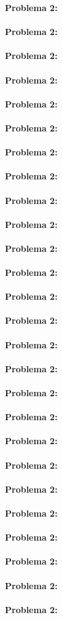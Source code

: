 \documentclass[10pt]{article}
\begin{document}
\textbf{Problema 2:} \\ \\
\textbf{Problema 2:} \\ \\
\textbf{Problema 2:} \\ \\
\textbf{Problema 2:} \\ \\
\textbf{Problema 2:} \\ \\
\textbf{Problema 2:} \\ \\
\textbf{Problema 2:} \\ \\
\textbf{Problema 2:} \\ \\

\textbf{Problema 2:} \\ \\
\textbf{Problema 2:} \\ \\
\textbf{Problema 2:} \\ \\
\textbf{Problema 2:} \\ \\
\textbf{Problema 2:} \\ \\
\textbf{Problema 2:} \\ \\
\textbf{Problema 2:} \\ \\
\textbf{Problema 2:} \\ \\
\textbf{Problema 2:} \\ \\


\textbf{Problema 2:} \\ \\
\textbf{Problema 2:} \\ \\
\textbf{Problema 2:} \\ \\
\textbf{Problema 2:} \\ \\
\textbf{Problema 2:} \\ \\
\textbf{Problema 2:} \\ \\
\textbf{Problema 2:} \\ \\
\textbf{Problema 2:} \\ \\
\textbf{Problema 2:} \\ \\
\end{document}
